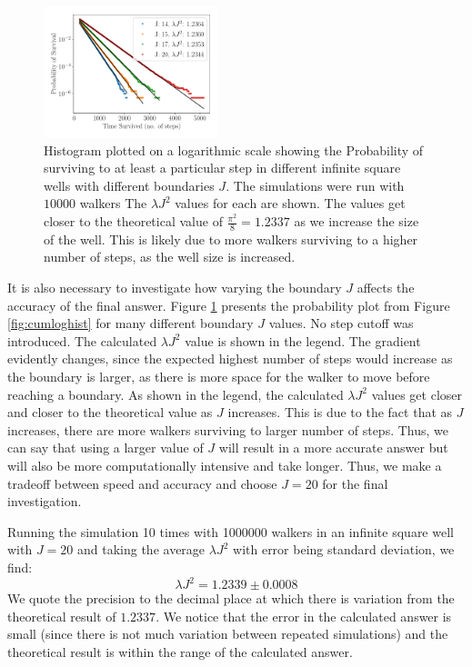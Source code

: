 \documentclass[journal]{IEEEtran}
\begin{document}
\begin{figure}[!ht]
  \begin{center}
    \includegraphics[width=0.45\textwidth]{images/multiplot.pdf}
    \caption{Histogram plotted on a logarithmic scale showing the Probability of
      surviving to at least a particular step in different infinite square wells
      with different boundaries $J$. The simulations were run with $10000$
      walkers The $\lambda J^2$ values for each are shown. The values get closer
      to the theoretical value of $\frac{\pi^2}{8} = 1.2337$ as we increase the
      size of the well. This is likely due to more walkers surviving to a higher
      number of steps, as the well size is increased.}
    \label{fig:multi_line_plot}
  \end{center}
\end{figure}

It is also necessary to investigate how varying the boundary $J$ affects the
accuracy of the final answer. Figure \ref{fig:multi_line_plot} presents the
probability plot from Figure \ref{fig:cumloghist} for many different boundary
$J$ values. No step cutoff was introduced. The calculated $\lambda J^2$ value is
shown in the legend. The gradient evidently changes, since the expected highest
number of steps would increase as the boundary is larger, as there is more
space for the walker to move before reaching a boundary. As shown in the legend,
the calculated $\lambda J^2$ values get closer and closer to the
theoretical value as $J$ increases. This is due to the fact that as $J$
increases, there are more walkers surviving to larger number of steps. Thus, we
can say that using a larger value of $J$ will result in a more accurate answer
but will also be more computationally intensive and take longer. Thus, we make a
tradeoff between speed and accuracy and choose $J=20$ for the final
investigation.

Running the simulation 10 times with 1000000 walkers in an infinite square well
with $J=20$ and taking the average $\lambda J^2$ with error being standard
deviation, we find:
\begin{equation}
  \lambda J^2 = 1.2339 \pm 0.0008
  \nonumber
\end{equation}
We quote the precision to the decimal place at which there is variation from the
theoretical result of $1.2337$. We notice that the error in the calculated
answer is small (since there is not much variation between repeated simulations)
and the theoretical result is within the range of the calculated answer.
\end{document}
